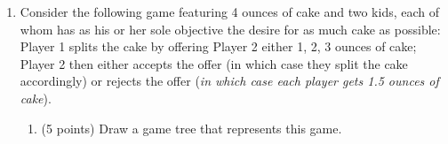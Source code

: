 \documentclass{article}
\newcommand{\mybigskip}{\vspace{1in}}
\newcommand{\myitem}{\item (5 points)\ }
\begin{document}
\begin{enumerate}
\begin{comment}
    \TC*~[tnpos=r]{(3,3)}

    \pstree[treemode=R]{\TC*~{2}}
    {
        \pstree[treemode=R]{\TC*~{1}}
        {
            \TC*~[tnpos=r]{(6, 6)}
            \TC*~[tnpos=r]{(1, 3)}
        }
        \TC*~[tnpos=r]{(1, 10)}
    }
}
}
\end{pspicture}
\end{figure}
\end{center}





    \begin{enumerate}
    \myitem Identify (e.g., by circling) the likely outcome of this game.

\begin{KEY}
Backward induction predicts an outcome of (3, 3).
\end{KEY}

    \myitem Is this outcome Pareto efficient? Yes  No  (Circle one. If it is not Pareto efficient, identify, e.g., with a star, a Pareto improvement.)

\begin{KEY}
No; a Pareto improvement is (6, 6).
\end{KEY}

    \end{enumerate}

\begin{EXAM}
\vspace{.3in}%
\end{EXAM}
\end{comment}











\item \begin{EXAM} Consider the following game featuring 4 ounces of cake and two kids, each of whom has as his or her sole objective the desire for as much cake as possible: Player 1 splits the cake by offering Player 2 either 1, 2, 3 ounces of cake; Player 2 then either accepts the offer (in which case they split the cake accordingly) or rejects the offer (\emph{in which case each player gets 1.5 ounces of cake}). \end{EXAM}

    \begin{enumerate}
    \item \begin{EXAM} (5 points) Draw a game tree that represents this game. \vspace*{2.6in}\end{EXAM}


\end{enumerate}
\end{enumerate}
\end{document}
